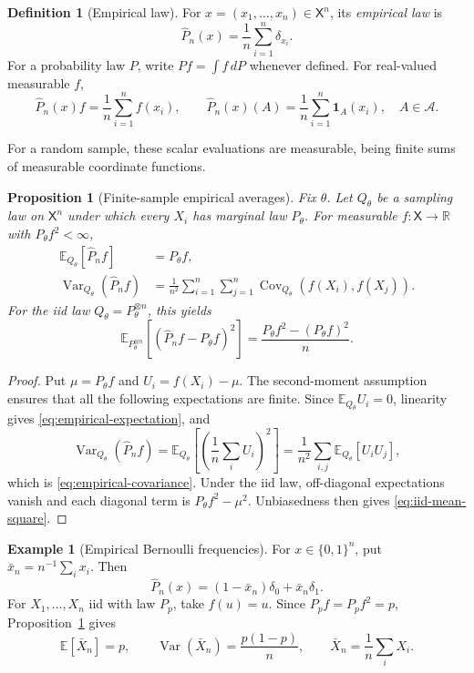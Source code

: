 \documentclass[11pt,oneside]{book}
\newtheorem{proposition}[theorem]{Proposition}
\theoremstyle{definition}
\newtheorem{definition}[theorem]{Definition}
\newtheorem{example}[theorem]{Example}
\theoremstyle{remark}
\newcommand{\R}{\mathbb R}
\begin{document}
\begin{definition}[Empirical law]
\label{def:empirical-law}
For $x=(x_1,\ldots,x_n)\in\mathsf X^n$, its \emph{empirical law} is
\[
\widehat P_n(x)=\frac1n\sum_{i=1}^n\delta_{x_i}.
\]
For a probability law $P$, write $Pf=\int f\,dP$ whenever defined.
For real-valued measurable $f$,
\[
\widehat P_n(x)f=\frac1n\sum_{i=1}^n f(x_i),\qquad
\widehat P_n(x)(A)=\frac1n\sum_{i=1}^n\mathbf1_A(x_i),
\quad A\in\mathcal A.
\]
\end{definition}

For a random sample, these scalar evaluations are measurable, being finite
sums of measurable coordinate functions.

\begin{proposition}[Finite-sample empirical averages]
\label{prop:empirical-moments}
Fix $\theta$. Let $Q_\theta$ be a sampling law on $\mathsf X^n$ under which
every $X_i$ has marginal law $P_\theta$.
For measurable $f:\mathsf X\to\R$ with $P_\theta f^2<\infty$,
\begin{align}
\mathbb E_{Q_\theta}[\widehat P_n f]
&=P_\theta f, \label{eq:empirical-expectation}\\
\operatorname{Var}_{Q_\theta}(\widehat P_n f)
&=\frac1{n^2}\sum_{i=1}^n\sum_{j=1}^n
\operatorname{Cov}_{Q_\theta}(f(X_i),f(X_j)).
\label{eq:empirical-covariance}
\end{align}
For the iid law $Q_\theta=P_\theta^{\otimes n}$, this yields
\begin{equation}
\mathbb E_{P_\theta^{\otimes n}}
\left[(\widehat P_n f-P_\theta f)^2\right]
=\frac{P_\theta f^2-(P_\theta f)^2}{n}.
\label{eq:iid-mean-square}
\end{equation}
\end{proposition}
\begin{proof}
Put $\mu=P_\theta f$ and $U_i=f(X_i)-\mu$. The second-moment assumption
ensures that all the following expectations are finite. Since
$\mathbb E_{Q_\theta}U_i=0$, linearity gives
\eqref{eq:empirical-expectation}, and
\[
\operatorname{Var}_{Q_\theta}(\widehat P_n f)
=\mathbb E_{Q_\theta}\left[\left(\frac1n\sum_iU_i\right)^2\right]
=\frac1{n^2}\sum_{i,j}\mathbb E_{Q_\theta}[U_iU_j],
\]
which is \eqref{eq:empirical-covariance}.
Under the iid law, off-diagonal expectations vanish and each diagonal term
is $P_\theta f^2-\mu^2$. Unbiasedness then gives
\eqref{eq:iid-mean-square}.
\end{proof}
\begin{example}[Empirical Bernoulli frequencies]
\label{ex:empirical-bernoulli}
For $x\in\{0,1\}^n$, put $\bar x_n=n^{-1}\sum_i x_i$. Then
\[
\widehat P_n(x)=(1-\bar x_n)\delta_0+\bar x_n\delta_1.
\]
For $X_1,\ldots,X_n$ iid with law $P_p$, take $f(u)=u$.
Since $P_pf=P_pf^2=p$, Proposition~\ref{prop:empirical-moments} gives
\[
\mathbb E[\bar X_n]=p,\qquad
\operatorname{Var}(\bar X_n)=\frac{p(1-p)}n,
\qquad \bar X_n=\frac1n\sum_iX_i.
\]
\end{example}
\end{document}
